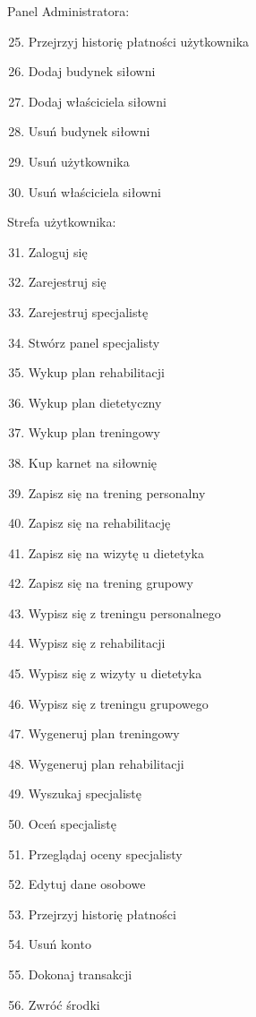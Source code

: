 \documentclass[
]{article}
\providecommand{\tightlist}{%
  \setlength{\itemsep}{0pt}\setlength{\parskip}{0pt}}
\begin{document}
{Panel Administratora:}

\begin{enumerate}
\setcounter{enumi}{24}
\tightlist
\item
  {Przejrzyj historię płatności użytkownika}
\item
  {Dodaj budynek siłowni}
\item
  {Dodaj właściciela siłowni}
\item
  {Usuń budynek siłowni}
\item
  {Usuń użytkownika}
\item
  {Usuń właściciela siłowni}
\end{enumerate}

{Strefa użytkownika:}

\begin{enumerate}
\setcounter{enumi}{30}
\tightlist
\item
  {Zaloguj się}
\item
  {Zarejestruj się}
\item
  {Zarejestruj specjalistę}
\item
  {Stwórz panel specjalisty}
\item
  {Wykup plan rehabilitacji}
\item
  {Wykup plan dietetyczny}
\item
  {Wykup plan treningowy}
\item
  {Kup karnet na siłownię}
\item
  {Zapisz się na trening personalny}
\item
  {Zapisz się na rehabilitację}
\item
  {Zapisz się na wizytę u dietetyka}
\item
  {Zapisz się na trening grupowy}
\item
  {Wypisz się z treningu personalnego}
\item
  {Wypisz się z rehabilitacji}
\item
  {Wypisz się z wizyty u dietetyka}
\item
  {Wypisz się z treningu grupowego}
\item
  {Wygeneruj plan treningowy}
\item
  {Wygeneruj plan rehabilitacji}
\item
  {Wyszukaj specjalistę}
\item
  {Oceń specjalistę}
\item
  {Przeglądaj oceny specjalisty}
\item
  {Edytuj dane osobowe}
\item
  {Przejrzyj historię płatności}
\item
  {Usuń konto}
\item
  {Dokonaj transakcji}
\item
  {Zwróć środki}
\end{enumerate}
\end{document}
